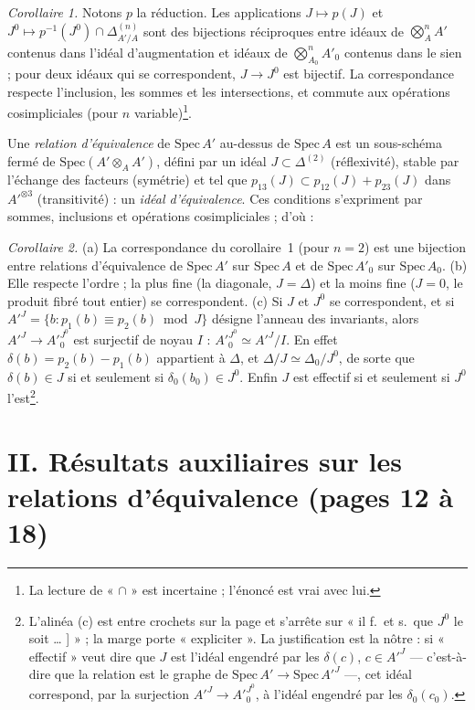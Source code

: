 \documentclass[11pt,a4paper]{article}
\begin{document}
\emph{Corollaire 1.} Notons $p$ la réduction. Les applications $J \mapsto
p(J)$ et $J^0 \mapsto p^{-1}(J^0) \cap \Delta^{(n)}_{A'/A}$ sont des
bijections réciproques entre idéaux de $\bigotimes^n_A A'$ contenus dans
l'idéal d'augmentation et idéaux de $\bigotimes^n_{A_0} A'_0$ contenus dans
le sien ; pour deux idéaux qui se correspondent, $J \to J^0$ est bijectif.
La correspondance respecte l'inclusion, les sommes et les intersections, et
commute aux opérations cosimpliciales (pour $n$ variable)\footnote{La lecture
de « $\cap$ » est incertaine ; l'énoncé est vrai avec lui.}.

Une \emph{relation d'équivalence} de $\mathrm{Spec}\, A'$ au-dessus de
$\mathrm{Spec}\, A$ est un sous-schéma fermé de $\mathrm{Spec}(A' \otimes_A
A')$, défini par un idéal $J \subset \Delta^{(2)}$ (réflexivité), stable par
l'échange des facteurs (symétrie) et tel que $p_{13}(J) \subset p_{12}(J) +
p_{23}(J)$ dans $A'^{\otimes 3}$ (transitivité) : un \emph{idéal
d'équivalence}. Ces conditions s'expriment par sommes, inclusions et
opérations cosimpliciales ; d'où :

\emph{Corollaire 2.} (a) La correspondance du corollaire~1 (pour $n = 2$) est
une bijection entre relations d'équivalence de $\mathrm{Spec}\, A'$ sur
$\mathrm{Spec}\, A$ et de $\mathrm{Spec}\, A'_0$ sur $\mathrm{Spec}\, A_0$.
(b) Elle respecte l'ordre ; la plus fine (la diagonale, $J = \Delta$) et la
moins fine ($J = 0$, le produit fibré tout entier) se correspondent. (c) Si
$J$ et $J^0$ se correspondent, et si $A'^{J} = \{ b : p_1(b) \equiv p_2(b)
\bmod J \}$ désigne l'anneau des invariants, alors $A'^{J} \to A'^{J^0}_0$
est surjectif de noyau $I$ : $A'^{J^0}_0 \simeq A'^{J}/I$. En effet $\delta(b)
= p_2(b) - p_1(b)$ appartient à $\Delta$, et $\Delta/J \simeq \Delta_0/J^0$,
de sorte que $\delta(b) \in J$ si et seulement si $\delta_0(b_0) \in J^0$.
Enfin $J$ est effectif si et seulement si $J^0$ l'est\footnote{L'alinéa (c)
est entre crochets sur la page et s'arrête sur « il f.\ et s.\ que $J^0$ le
soit … ] » ; la marge porte « expliciter ». La justification est la nôtre : si
« effectif » veut dire que $J$ est l'idéal engendré par les $\delta(c)$, $c
\in A'^{J}$ — c'est-à-dire que la relation est le graphe de $\mathrm{Spec}\,
A' \to \mathrm{Spec}\, A'^{J}$ —, cet idéal correspond, par la surjection
$A'^{J} \to A'^{J^0}_0$, à l'idéal engendré par les $\delta_0(c_0)$.}.

\section*{II. Résultats auxiliaires sur les relations d'équivalence (pages 12 à 18)}
\end{document}

